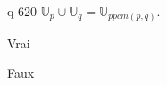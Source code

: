 \begin{truefalse}{q-620}
$\mathbb U_p \cup  \mathbb U_q=\mathbb U_{ppcm(p,q)}$.
\item Vrai
\item* Faux
\end{truefalse}

